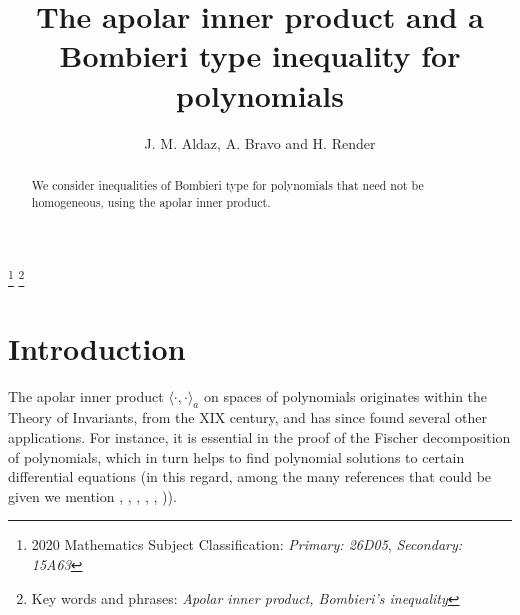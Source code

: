 \documentclass[12pt]{amsart}
\begin{document}
\title{The apolar inner product and a Bombieri type inequality for polynomials}
\author{ J. M. Aldaz, A. Bravo and H. Render}
\address{J.M. Aldaz: Instituto de Ciencias Matem\'aticas (CSIC-UAM-UC3M-UCM)
and Departamento de Matem\'aticas, Universidad Aut\'onoma de Madrid,
Cantoblanco 28049, Madrid, Spain.}

\address{A. Bravo: Instituto de Ciencias Matem\'aticas (CSIC-UAM-UC3M-UCM)
and Departamento de Matem\'aticas, Universidad Aut\'onoma de Madrid,
Cantoblanco 28049, Madrid, Spain.}

\address{H. Render: School of Mathematical Sciences, University College
Dublin, Dublin 4, Ireland.}


\thanks{2020 Mathematics Subject Classification: \emph{Primary: 26D05}, 
\emph{Secondary:  15A63}}
\thanks{Key words and phrases: \emph{Apolar inner product,  Bombieri's inequality}}




 

\begin{abstract} We consider inequalities of Bombieri type for polynomials that need not be homogeneous, using the apolar inner product. 
\end{abstract}

\maketitle

\section{Introduction} The apolar inner product $\langle  \cdot,\cdot\rangle_{a}$ on spaces of polynomials originates within the Theory of Invariants, from the XIX century, and has since found several other applications. For instance, it is essential in the proof of the Fischer decomposition of polynomials, which in turn helps to find polynomial solutions to certain differential equations (in this regard, among the many references that could be given we mention  \cite{Shap89}, \cite{EbSh95}, \cite{EbSh96}, \cite{Rend08}, \cite{KL18}, \cite{AlRe23})). 
\end{document}
